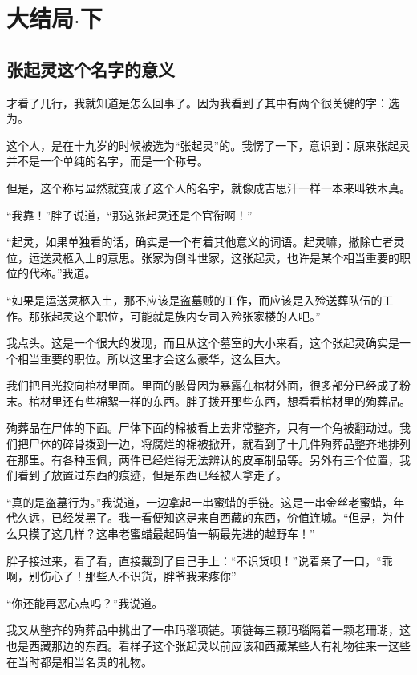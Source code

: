 \part{大结局$\cdot$下}
\chapter{张起灵这个名字的意义}

才看了几行，我就知道是怎么回事了。因为我看到了其中有两个很关键的字：选为。

这个人，是在十九岁的时候被选为“张起灵”的。我愣了一下，意识到：原来张起灵并不是一个单纯的名字，而是一个称号。

但是，这个称号显然就变成了这个人的名宇，就像成吉思汗一样一本来叫铁木真。

“我靠！”胖子说道，“那这张起灵还是个官衔啊！”

“起灵，如果单独看的话，确实是一个有着其他意义的词语。起灵嘛，撤除亡者灵位，运送灵柩入土的意思。张家为倒斗世家，这张起灵，也许是某个相当重要的职位的代称。”我道。

“如果是运送灵柩入土，那不应该是盗墓贼的工作，而应该是入殓送葬队伍的工作。那张起灵这个职位，可能就是族内专司入殓张家楼的人吧。”

我点头。这是一个很大的发现，而且从这个墓室的大小来看，这个张起灵确实是一个相当重要的职位。所以这里才会这么豪华，这么巨大。

我们把目光投向棺材里面。里面的骸骨因为暴露在棺材外面，很多部分已经成了粉末。棺材里还有些棉絮一样的东西。胖子拨开那些东西，想看看棺材里的殉葬品。

殉葬品在尸体的下面。尸体下面的棉被看上去非常整齐，只有一个角被翻动过。我们把尸体的碎骨拨到一边，将腐烂的棉被掀开，就看到了十几件殉葬品整齐地排列在那里。有各种玉佩，两件已经烂得无法辨认的皮革制品等。另外有三个位置，我们看到了放置过东西的痕迹，但是东西已经被人拿走了。

“真的是盗墓行为。”我说道，一边拿起一串蜜蜡的手链。这是一串金丝老蜜蜡，年代久远，已经发黑了。我一看便知这是来自西藏的东西，价值连城。“但是，为什么只摸了这几样？这串老蜜蜡最起码值一辆最先进的越野车！”

胖子接过来，看了看，直接戴到了自己手上：“不识货呗！”说着亲了一口，“乖啊，别伤心了！那些人不识货，胖爷我来疼你”

“你还能再恶心点吗？”我说道。

我又从整齐的殉葬品中挑出了一串玛瑙项链。项链每三颗玛瑙隔着一颗老珊瑚，这也是西藏那边的东西。看样子这个张起灵以前应该和西藏某些人有礼物往来一这些在当时都是相当名贵的礼物。

